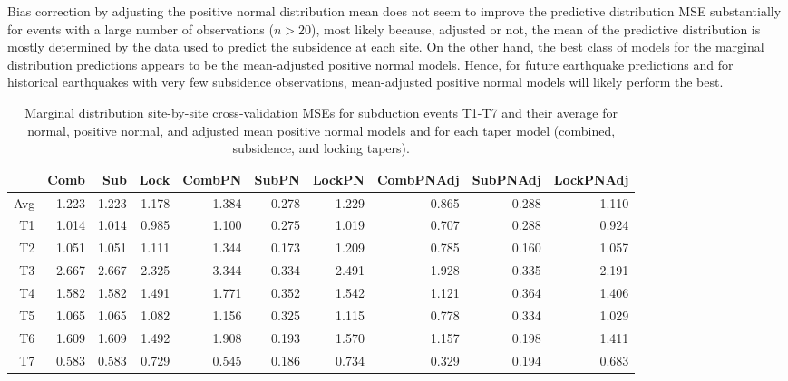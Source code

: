 {Bias correction by adjusting the positive normal distribution mean does not seem to improve the predictive distribution MSE substantially for events with a large number of observations ($n >20$), most likely because, adjusted or not, the mean of the predictive distribution is mostly determined by the data used to predict the subsidence at each site.  On the other hand, the best class of models for the marginal distribution predictions appears to be the mean-adjusted positive normal models.  Hence, for future earthquake predictions and for historical earthquakes with very few subsidence observations, mean-adjusted positive normal models will likely perform the best.

\begin{table}[ht]
\centering
\begin{tabular}{rrrrrrrrrr}
  \hline
 & Comb & Sub & Lock & CombPN & SubPN & LockPN & CombPNAdj & SubPNAdj & LockPNAdj \\ 
  \hline
    Avg & 1.223 & 1.223 & 1.178 & 1.384 & 0.278 & 1.229 & 0.865 & 0.288 & 1.110 \\ 
T1 & 1.014 & 1.014 & 0.985 & 1.100 & 0.275 & 1.019 & 0.707 & 0.288 & 0.924 \\ 
  T2 & 1.051 & 1.051 & 1.111 & 1.344 & 0.173 & 1.209 & 0.785 & 0.160 & 1.057 \\ 
  T3 & 2.667 & 2.667 & 2.325 & 3.344 & 0.334 & 2.491 & 1.928 & 0.335 & 2.191 \\ 
  T4 & 1.582 & 1.582 & 1.491 & 1.771 & 0.352 & 1.542 & 1.121 & 0.364 & 1.406 \\ 
  T5 & 1.065 & 1.065 & 1.082 & 1.156 & 0.325 & 1.115 & 0.778 & 0.334 & 1.029 \\ 
  T6 & 1.609 & 1.609 & 1.492 & 1.908 & 0.193 & 1.570 & 1.157 & 0.198 & 1.411 \\ 
  T7 & 0.583 & 0.583 & 0.729 & 0.545 & 0.186 & 0.734 & 0.329 & 0.194 & 0.683 \\ 
   \hline
\end{tabular}
\caption{Marginal distribution site-by-site cross-validation MSEs for subduction events T1-T7 and their average for normal, positive normal, and adjusted mean positive normal models and for each taper model (combined, subsidence, and locking tapers).}
\label{margMSE}
\end{table}

}
